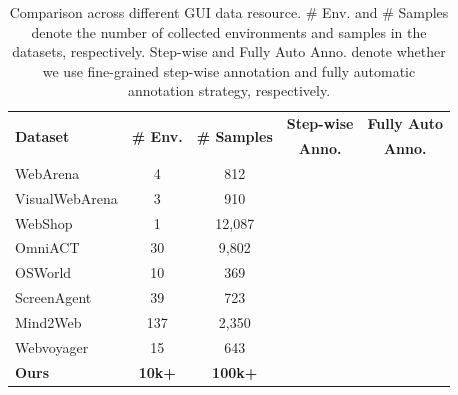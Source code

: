 \documentclass{article} %
\begin{document}
\newcommand{\cmark}{\ding{51}}  %
\newcommand{\xmark}{\ding{55}}  %
\begin{table}
\vspace{-1.2em}
\caption{Comparison across different GUI data resource. \# Env. and \# Samples denote the number of collected environments and samples in the datasets, respectively. Step-wise and Fully Auto Anno. denote whether we use fine-grained step-wise annotation and fully automatic annotation strategy, respectively.}
\vspace{-0.3em}
\centering
\small
\begin{tabular}{l c c c c}
\toprule
\multirow{2}{*}{\textbf{Dataset}} & \multirow{2}{*}{\textbf{\# Env.}} & \multirow{2}{*}{\textbf{\# Samples}} & \textbf{Step-wise} & \textbf{Fully Auto} \\
                 &                    &                      & \textbf{Anno.}      & \textbf{Anno.} \\
\midrule
WebArena         & 4     & 812            & \cmark & \xmark \\
VisualWebArena   & 3     & 910            & \cmark & \xmark \\
WebShop          & 1     & 12,087   & \xmark & \xmark \\
OmniACT          & 30    & 9,802          & \xmark & \xmark \\
OSWorld          & 10    & 369            & \xmark & \xmark \\
ScreenAgent      & 39    & 723            & \xmark & \xmark \\
Mind2Web         & 137   & 2,350          & \cmark & \xmark \\
Webvoyager       & 15    & 643            & \xmark & \cmark \\
\midrule
\textbf{Ours}    & \textbf{10k+} & \textbf{100k+}         & \cmark & \cmark \\
\bottomrule
\end{tabular}
\label{tab:dataset-comparison}
\vspace{-1em}
\end{table}
\end{document}
